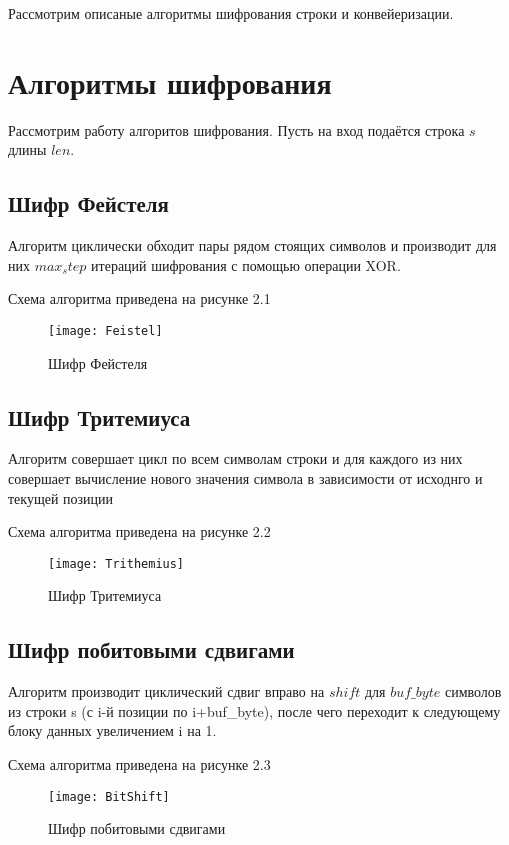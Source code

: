 Рассмотрим описаные алгоритмы шифрования строки и конвейеризации.

\section{Алгоритмы шифрования}
Рассмотрим работу алгоритов шифрования. Пусть на вход подаётся строка $s$ длины $len$.

	\subsection{Шифр Фейстеля}
	Алгоритм циклически обходит пары рядом стоящих символов и производит для них $max_step$ итераций шифрования с помощью операции XOR.
	
	Схема алгоритма приведена на рисунке 2.1
	\begin{figure}[h]
		\begin{center}
			{\texttt{[image: Feistel]}}
			\caption{Шифр Фейстеля}
		\end{center}
	\end{figure}


	\subsection{Шифр Тритемиуса}
	Алгоритм совершает цикл по всем символам строки и для каждого из них совершает вычисление нового значения символа в зависимости от исходнго и текущей позиции
	
	Схема алгоритма приведена на рисунке 2.2
	\begin{figure}[h]
		\begin{center}
			{\texttt{[image: Trithemius]}}
			\caption{Шифр Тритемиуса}
		\end{center}
	\end{figure}


	\subsection{Шифр побитовыми сдвигами}
	Алгоритм производит циклический сдвиг вправо на $shift$ для $buf\_byte$ символов из строки s (с i-й позиции по i+buf\_byte), после чего переходит к следующему блоку данных увеличением i на 1.
	
	Схема алгоритма приведена на рисунке 2.3
	\begin{figure}[h]
		\begin{center}
			{\texttt{[image: BitShift]}}
			\caption{Шифр побитовыми сдвигами}
		\end{center}
	\end{figure}


